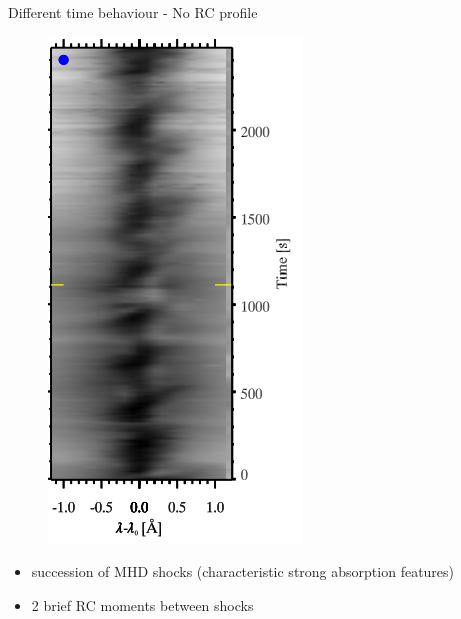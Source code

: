 \documentclass{beamer}
\begin{document}
\begin{frame}{Different time behaviour - No RC profile}
\begin{minipage}{0.59\linewidth}
\begin{figure}[H]
 \centering
 \includegraphics[scale=0.4]{im1-p2t.png}
\end{figure}
\end{minipage}	
\begin{minipage}{0.39\linewidth}
\begin{itemize}
\item succession of MHD shocks (characteristic strong absorption features)
\item 2 brief RC moments between shocks
\end{itemize}
\end{minipage}	

\end{frame}
\end{document}
